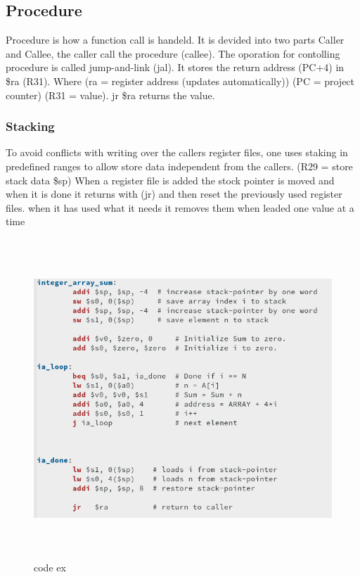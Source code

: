 \documentclass{article}
\begin{document}
\subsection{Procedure}
Procedure is how a function call is handeld. It is devided into two parts Caller and Callee,
the caller call the procedure (callee).
The oporation for contolling procedure is called jump-and-link (jal).
It stores the return address (PC+4) in \$ra (R31).
Where (ra = register address (updates automatically))
(PC = project counter)
(R31 = value).
jr \$ra returns the value.

\subsubsection{Stacking}
To avoid conflicts with writing over the callers register files, one uses staking in predefined
ranges to allow store data independent from the callers. 
(R29 =  store stack data \$sp)
When a register file is added the stock pointer is moved and when it is done it returns with (jr) and then
reset the previously used register files.
when it has used what it needs it removes them when leaded one value at a time


\begin{figure}[h]
    \vspace{10mm}
    \centering
    \includegraphics[width=16cm, height=12cm]{image/code-ex.png} 
    \caption{code ex}
\end{figure}
\end{document}
